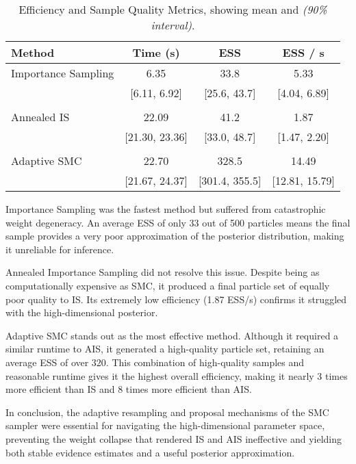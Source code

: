 \documentclass[a4paper, 12pt]{article}
\begin{document}
    \begin{table}[h!]
        \centering
        \begin{tabular}{l c c c}
            \hline
            \textbf{Method} & \textbf{Time (s)} & \textbf{ESS} & \textbf{ESS / s} \\
            \hline
            Importance Sampling & 6.35 & 33.8 & 5.33 \\
            & [6.11, 6.92] & [25.6, 43.7] & [4.04, 6.89] \\
            & & & \\
            Annealed IS & 22.09 & 41.2 & 1.87 \\
            & [21.30, 23.36] & [33.0, 48.7] & [1.47, 2.20] \\
            & & & \\
            Adaptive SMC & 22.70 & 328.5 & 14.49 \\
            & [21.67, 24.37] & [301.4, 355.5] & [12.81, 15.79] \\
            \hline
        \end{tabular}
        \caption{Efficiency and Sample Quality Metrics, showing mean and \textit{(90\% interval)}.}
    \end{table}

    Importance Sampling was the fastest method but suffered from catastrophic weight degeneracy. An average ESS of only 33 out of 500 particles means the final sample provides a very poor approximation of the posterior distribution, making it unreliable for inference.
    
    Annealed Importance Sampling did not resolve this issue. Despite being as computationally expensive as SMC, it produced a final particle set of equally poor quality to IS. Its extremely low efficiency (1.87 ESS/s) confirms it struggled with the high-dimensional posterior.
    
    Adaptive SMC stands out as the most effective method. Although it required a similar runtime to AIS, it generated a high-quality particle set, retaining an average ESS of over 320. This combination of high-quality samples and reasonable runtime gives it the highest overall efficiency, making it nearly 3 times more efficient than IS and 8 times more efficient than AIS.

    In conclusion, the adaptive resampling and proposal mechanisms of the SMC sampler were essential for navigating the high-dimensional parameter space, preventing the weight collapse that rendered IS and AIS ineffective and yielding both stable evidence estimates and a useful posterior approximation.
\end{document}

